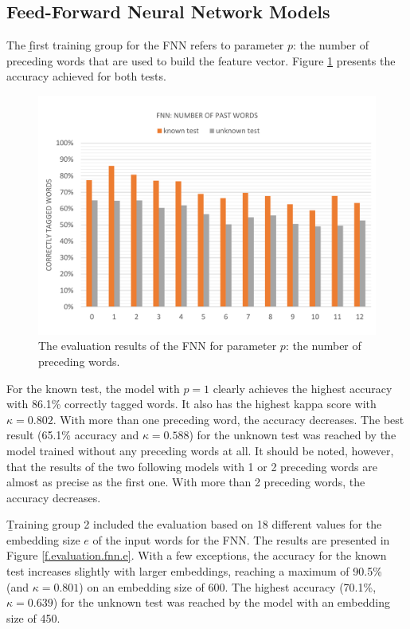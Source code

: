 \subsection{Feed-Forward Neural Network Models}\label{c.evaluation.results.fnn}
The \b{first training group} for the FNN refers to parameter $p$: the number of preceding words that are used to build the feature vector. Figure \ref{f.evaluation.fnn.p} presents the accuracy achieved for both tests.

\begin{figure}[H]
	\hspace{-5mm}\includegraphics[width=1.07\textwidth]{images/evaluation_fnn_p}
	\caption[FNN Evaluation: Number of Past Words]{The evaluation results of the FNN for parameter $p$: the number of preceding words.}
	\label{f.evaluation.fnn.p}
\end{figure}

For the known test, the model with $p=1$ clearly achieves the highest accuracy with 86.1\% correctly tagged words. It also has the highest kappa score with $\kappa=0.802$. With more than one preceding word, the accuracy decreases. The best result (65.1\% accuracy and $\kappa=0.588$) for the unknown test was reached by the model trained without any preceding words at all. It should be noted, however, that the results of the two following models with 1 or 2 preceding words are almost as precise as the first one. With more than 2 preceding words, the accuracy decreases.

\b{Training group 2} included the evaluation based on 18 different values for the embedding size $e$ of the input words for the FNN. The results are presented in Figure \ref{f.evaluation.fnn.e}. With a few exceptions, the accuracy for the known test  increases slightly with larger embeddings, reaching a maximum of 90.5\% (and $\kappa=0.801$) on an embedding size of 600. The highest accuracy (70.1\%, $\kappa=0.639$) for the unknown test was reached by the model with an embedding size of 450.

